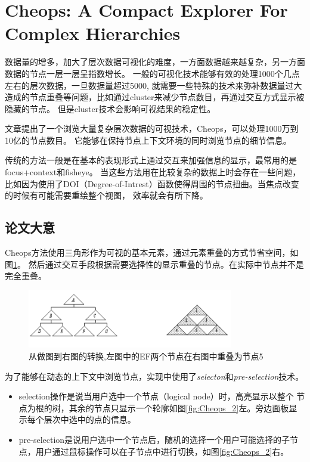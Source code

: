 \documentclass{article}
\begin{document}
		\section{Cheops: A Compact Explorer For Complex Hierarchies\cite{Beaudoin1996}}
		数据量的增多，加大了层次数据可视化的难度，一方面数据越来越复杂，另一方面数据的节点一层一层呈指数增长。
		一般的可视化技术能够有效的处理1000个几点左右的层次数据，一旦数据量超过5000,
		就需要一些特殊的技术来弥补数据量过大造成的节点重叠等问题，比如通过cluster来减少节点数目，再通过交互方式显示被隐藏的节点。
		但是cluster技术会影响可视结果的稳定性。

		文章提出了一个浏览大量复杂层次数据的可视技术，Cheops，可以处理1000万到10亿的节点数目。
		它能够在保持节点上下文环境的同时浏览节点的细节信息。

		传统的方法一般是在基本的表现形式上通过交互来加强信息的显示，最常用的是focus+context和fisheye。
		当这些方法用在比较复杂的数据上时会存在一些问题，
		比如因为使用了DOI（Degree-of-Intrest）函数使得周围的节点扭曲。当焦点改变的时候有可能需要重绘整个视图，
		效率就会有所下降。

		\subsection{论文大意}
		Cheops方法使用三角形作为可视的基本元素，通过元素重叠的方式节省空间，如图\ref{fig:Cheops_1}。
		然后通过交互手段根据需要选择性的显示重叠的节点。在实际中节点并不是完全重叠。

		\begin{figure}[h]
			\centering
			\includegraphics[width=0.8\textwidth]{_img/Cheops_1.png}
			\caption{从做图到右图的转换,左图中的EF两个节点在右图中重叠为节点5}
			\label{fig:Cheops_1}
		\end{figure}

		为了能够在动态的上下文中浏览节点，实现中使用了\emph{selecton}和\emph{pre-selection}技术。

		\begin{itemize}
			\item selection操作是说当用户选中一个节点（logical node）时，高亮显示以整个
				节点为根的树，其余的节点只显示一个轮廓如图\ref{fig:Cheops_2}左。旁边面板显示每个层次中选中的点的信息。
			\item pre-selection是说用户选中一个节点后，随机的选择一个用户可能选择的子节
				点，用户通过鼠标操作可以在子节点中进行切换，如图\ref{fig:Cheops_2}右。
		\end{itemize}
\end{document}
